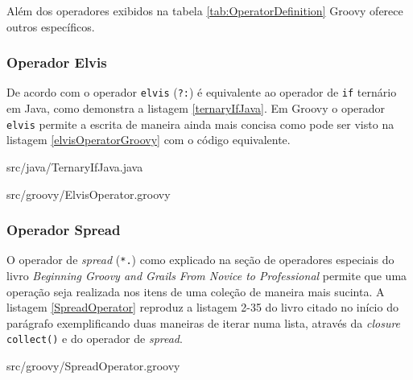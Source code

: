 \documentclass[12pt]{article}
\begin{document}
    Além dos operadores exibidos na tabela \ref{tab:OperatorDefinition} Groovy 
    oferece outros específicos.

\subsubsection{Operador Elvis}

    De acordo com \cite{beginingGroovy:2008} o operador \texttt{elvis} (\texttt{?:}) é equivalente
    ao operador de \texttt{if} ternário em Java, como demonstra a listagem \ref{ternaryIfJava}.
    Em Groovy o operador \texttt{elvis} permite a escrita de maneira ainda mais concisa 
    como pode ser visto na listagem \ref{elvisOperatorGroovy} com o código equivalente.
    
    
                    {src/java/TernaryIfJava.java}
    
    
                    {src/groovy/ElvisOperator.groovy}
                    
\subsubsection{Operador Spread}

    O operador de \emph{spread} (\texttt{*.}) como explicado na seção de operadores especiais do
    livro \emph{Beginning Groovy and Grails From Novice to Professional}\cite{beginingGroovy:2008} 
    permite que uma operação seja realizada nos itens de uma coleção de maneira 
    mais sucinta. A listagem \ref{SpreadOperator} reproduz a listagem 2-35 do livro
    citado no início do parágrafo exemplificando duas maneiras de iterar numa lista, 
    através da \emph{closure} \texttt{collect()} e do operador de \emph{spread}.
    
    
                    {src/groovy/SpreadOperator.groovy}

%
\end{document}
